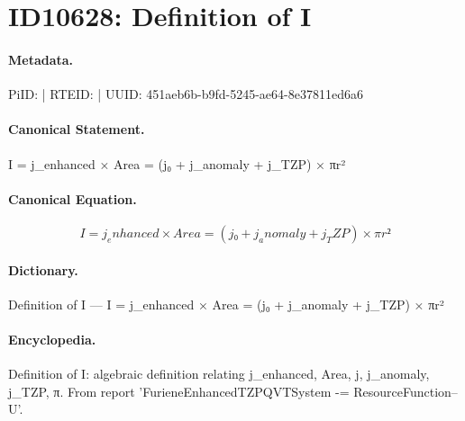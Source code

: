 \section*{ID10628: Definition of I}
\paragraph{Metadata.}
PiID:  | RTEID:  | UUID: 451aeb6b-b9fd-5245-ae64-8e37811ed6a6

\paragraph{Canonical Statement.}
I = j\_enhanced × Area = (j₀ + j\_anomaly + j\_TZP) × πr²

\paragraph{Canonical Equation.}
\[
I = j_enhanced × Area = (j₀ + j_anomaly + j_TZP) × πr²
\]

\paragraph{Dictionary.}
Definition of I — I = j\_enhanced × Area = (j₀ + j\_anomaly + j\_TZP) × πr²

\paragraph{Encyclopedia.}
Definition of I: algebraic definition relating j\_enhanced, Area, j, j\_anomaly, j\_TZP, π. From report 'FurieneEnhancedTZPQVTSystem -= ResourceFunction--U'.
